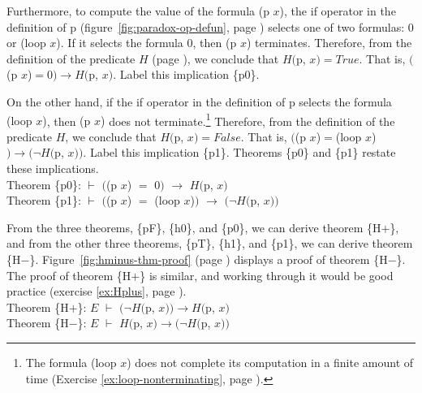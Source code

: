 Furthermore, to compute the value of the formula \textsf{(p $x$)},
the \textsf{if} operator in the definition of \textsf{p}
(figure~\ref{fig:paradox-op-defun}, page \pageref{fig:paradox-op-defun})
selects one of two formulas:
\textsf{0} or \textsf{(loop $x$)}.
If it selects the formula \textsf{0}, then \textsf{(p $x$)} terminates.
Therefore, from the definition of the predicate $H$ (page \pageref{def:predicate-H}),
we conclude that $H($p, $x)=True$.
That is, $($\textsf{(p $x$)}$=$\textsf{0}$)\rightarrow H($\textsf{p}, $x)$.
Label this implication \{p0\}.

On the other hand, if the \textsf{if} operator in the definition of \textsf{p}
selects the formula \textsf{(loop $x$)}, then \textsf{(p $x$)}
does not terminate.\footnote{The formula \textsf{(loop $x$)} does not complete its
computation in a finite amount of time
(Exercise \ref{ex:loop-nonterminating}, page \pageref{ex:loop-nonterminating}).}
Therefore, from the definition of the predicate $H$,
we conclude that $H($\textsf{p}, $x)=False$.
That is, $($\textsf{(\textsf{p} $x$)}$=$\textsf{(loop $x$)}$)\rightarrow(\neg H($\textsf{p}, $x))$.
Label this implication \{p1\}.
Theorems \{p0\} and \{p1\} restate these implications.
\vspace{2mm}\\
\hspace*{5mm}Theorem \{p0\}: $\vdash$  $($\textsf{(p $x$)} $=$ \textsf{0}$)$ $\rightarrow$ $H($\textsf{p}, $x)$ \\
\hspace*{5mm}Theorem \{p1\}: $\vdash$  $($\textsf{(p $x$)} $=$ \textsf{(loop $x$)}$)$ $\rightarrow$ $(\neg H($\textsf{p}, $x))$
\vspace{2mm}

From the three theorems, \{pF\}, \{h0\}, and \{p0\},
we can derive theorem \{H$+$\}, and
from the other three theorems, \{pT\}, \{h1\}, and \{p1\},
we can derive
theorem \{H$-$\}.
Figure~\ref{fig:hminus-thm-proof} (page \pageref{fig:hminus-thm-proof}) displays
a proof of theorem \{H$-$\}.
The proof of theorem \{H$+$\} is similar, and working through it would be
good practice (exercise \ref{ex:Hplus}, page \pageref{ex:Hplus}).
\vspace{2mm}\\
\hspace*{5mm}Theorem \{H$+$\}: $E$ $\vdash$ $(\neg H($\textsf{p}, $x)) \rightarrow H($\textsf{p}, $x)$ \\
\hspace*{5mm}Theorem \{H$-$\}: $E$ $\vdash$ $H($\textsf{p}, $x) \rightarrow (\neg H($\textsf{p}, $x))$
\vspace{2mm}

